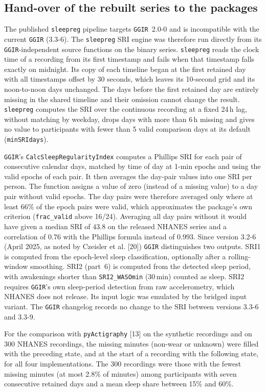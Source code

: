 \documentclass[12pt]{article}
\begin{document}
\subsection{Hand-over of the rebuilt series to the packages}
The published \texttt{sleepreg} pipeline targets \texttt{GGIR}~2.0-0 and is incompatible with the current \texttt{GGIR} (3.3-6). The \texttt{sleepreg} SRI engine was therefore run directly from its \texttt{GGIR}-independent source functions on the binary series. \texttt{sleepreg} reads the clock time of a recording from its first timestamp and fails when that timestamp falls exactly on midnight. Its copy of each timeline began at the first retained day with all timestamps offset by 30 seconds, which leaves its 10-second grid and its noon-to-noon days unchanged. The days before the first retained day are entirely missing in the shared timeline and their omission cannot change the result. \texttt{sleepreg} computes the SRI over the continuous recording at a fixed 24\,h lag, without matching by weekday, drops days with more than 6\,h missing and gives no value to participants with fewer than 5 valid comparison days at its default (\texttt{minSRIdays}).

\texttt{GGIR}'s \texttt{CalcSleepRegularityIndex} computes a Phillips SRI for each pair of consecutive calendar days, matched by time of day at 1-min epochs and using the valid epochs of each pair. It then averages the day-pair values into one SRI per person. The function assigns a value of zero (instead of a missing value) to a day pair without valid epochs. The day pairs were therefore averaged only where at least 66\% of the epoch pairs were valid, which approximates the package's own criterion (\texttt{frac\_valid} above 16/24). Averaging all day pairs without it would have given a median SRI of $43.8$ on the released NHANES series and a correlation of $0.76$ with the Phillips formula instead of $0.993$. Since version 3.2-6 (April 2025, as noted by Czeisler et al. [20]) \texttt{GGIR} distinguishes two outputs. SRI1 is computed from the epoch-level sleep classification, optionally after a rolling-window smoothing. SRI2 (part~6) is computed from the detected sleep period, with awakenings shorter than \texttt{SRI2\_WASOmin} (30\,min) counted as sleep. SRI2 requires \texttt{GGIR}'s own sleep-period detection from raw accelerometry, which NHANES does not release. Its input logic was emulated by the bridged input variant. The \texttt{GGIR} changelog records no change to the SRI between versions 3.3-6 and 3.3-9.

For the comparison with \texttt{pyActigraphy} [13] on the synthetic recordings and on 300 NHANES recordings, the missing minutes (non-wear or unknown) were filled with the preceding state, and at the start of a recording with the following state, for all four implementations. The 300 recordings were those with the fewest missing minutes (at most 2.8\% of minutes) among participants with seven consecutive retained days and a mean sleep share between 15\% and 60\%.
\end{document}
